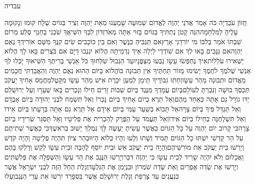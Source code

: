 \documentclass[../main/main.tex]{subfiles}
\begin{document}
\Incipit{}עבדיה\par
\vspace{\afterchapskip}
\RTLmulticolcolumns
\begin{multicols}{\ncols}
חֲזוֹן עֹבַדְיָה כֹּה אָמַר אֲדֹנַי יַהְוֶה לֶאֱדוֹם שְׁמוּעָה שָׁמַעְנוּ מֵאֵת יַהְוֶה וְצִיר בַּגּוֹיִם שֻׁלָּח קוּמוּ וְנָקוּמָה עָלֶיהָ לַמִּלְחָמָה\PreVerseSpace{}הִנֵּה קָטֹן נְתַתִּיךָ בַּגּוֹיִם בָּזוּי אַתָּה מְאֹד\PreVerseSpace{}זְדוֹן לִבְּךָ הִשִּׁיאֶךָ שֹׁכְנִי בְחַגְוֵי סֶלַע מְרוֹם שִׁבְתּוֹ אֹמֵר בְּלִבּוֹ מִי יוֹרִדֵנִי אָרֶץ\PreVerseSpace{}אִם תַּגְבִּיהַּ כַּנֶּשֶׁר וְאִם בֵּין כּוֹכָבִים שִׂים קִנֶּךָ מִשָּׁם אוֹרִידְךָ נְאֻם יַהְוֶה\PreVerseSpace{}אִם גַּנָּבִים בָּאוּ לְךָ אִם שׁוֹדְדֵי לַיְלָה אֵיךְ נִדְמֵיתָה הֲלוֹא יִגְנְבוּ דַּיָּם אִם בֹּצְרִים בָּאוּ לָךְ הֲלוֹא יַשְׁאִירוּ עֹלֵלוֹת\PreVerseSpace{}אֵיךְ נֶחְפְּשׂוּ עֵשָׂו נִבְעוּ מַצְפֻּנָיו\PreVerseSpace{}עַד הַגְּבוּל שִׁלְּחוּךָ כֹּל אַנְשֵׁי בְרִיתֶךָ הִשִּׁיאוּךָ יָכְלוּ לְךָ אַנְשֵׁי שְׁלֹמֶךָ לֹחֲמֶךָ\SubEnd{} יָשִׂימוּ מָזוֹר תַּחְתֶּיךָ אֵין תְּבוּנָה בּוֹ\PreVerseSpace{}הֲלוֹא בַּיּוֹם הַהוּא נְאֻם יַהְוֶה וְהַאֲבַדְתִּי חֲכָמִים מֵאֱדוֹם וּתְבוּנָה מֵהַר עֵשָׂו\PreVerseSpace{}וְחַתּוּ גִבּוֹרֶיךָ תֵּימָן לְמַעַן יִכָּרֶת אִישׁ מֵהַר עֵשָׂו מִקָּטֶל\PreVerseSpace{}מֵחֲמַס אָחִיךָ יַעֲקֹב תְּכַסְּךָ בוּשָׁה וְנִכְרַתָּ לְעוֹלָם\PreVerseSpace{}בְּיוֹם עֲמָדְךָ מִנֶּגֶד בְּיוֹם שְׁבוֹת זָרִים חֵילוֹ וְנָכְרִים בָּאוּ שְׁעָרָו וְעַל יְרוּשָׁלֵם יַדּוּ גוֹרָל גַּם אַתָּה כְּאַחַד מֵהֶם\PreVerseSpace{}וְאַל תֵּרֶא בְיוֹם אָחִיךָ בְּיוֹם נָכְרוֹ וְאַל תִּשְׂמַח לִבְנֵי יְהוּדָה בְּיוֹם אָבְדָם וְאַל תַּגְדֵּל פִּיךָ בְּיוֹם צָרָה\PreVerseSpace{}אַל תָּבוֹא בְשַׁעַר עַמִּי בְּיוֹם אֵידָם אַל תֵּרֶא גַם אַתָּה בְּרָעָתוֹ בְּיוֹם אֵידוֹ וְאַל תִּשְׁלָחֶנָּה\SubEnd{} בְחֵילוֹ בְּיוֹם אֵידוֹ\PreVerseSpace{}וְאַל תַּעֲמֹד עַל הַפֶּרֶק לְהַכְרִית אֶת פְּלִיטָיו וְאַל תַּסְגֵּר שְׂרִידָיו בְּיוֹם צָרָה\PreVerseSpace{}כִּי קָרוֹב יוֹם יַהְוֶה עַל כָּל הַגּוֹיִם כַּאֲשֶׁר עָשִׂיתָ יֵעָשֶׂה לָּךְ גְּמֻלְךָ יָשׁוּב בְּרֹאשֶׁךָ\PreVerseSpace{}כִּי כַּאֲשֶׁר שְׁתִיתֶם עַל הַר קָדְשִׁי יִשְׁתּוּ כָל הַגּוֹיִם תָּמִיד וְשָׁתוּ וְלָעוּ וְהָיוּ כְּלוֹא הָיוּ\PreVerseSpace{}וּבְהַר צִיּוֹן תִּהְיֶה פְלֵיטָה וְהָיָה קֹדֶשׁ וְיָרְשׁוּ בֵּית יַעֲקֹב אֵת מוֹרִשֵׁיהֶם\SubEnd{}\PreVerseSpace{}וְהָיָה בֵית יַעֲקֹב אֵשׁ וּבֵית יוֹסֵף לֶהָבָה וּבֵית עֵשָׂו לְקַשׁ וְדָלְקוּ בָהֶם וַאֲכָלוּם וְלֹא יִהְיֶה שָׂרִיד לְבֵית עֵשָׂו כִּי יַהְוֶה דִּבֵּר\PreVerseSpace{}וְיָרְשׁוּ הַנֶּגֶב אֶת הַר עֵשָׂו וְהַשְּׁפֵלָה אֶת פְּלִשְׁתִּים וְיָרְשׁוּ אֶת שְׂדֵה אֶפְרַיִם וְאֵת שְׂדֵה שֹׁמְרוֹן וּבִנְיָמִן אֶת הַגִּלְעָד\PreVerseSpace{}וְגָלֻת הַחֵל הַזֶּה לִבְנֵי יִשְׂרָאֵל אֲשֶׁר כְּנַעֲנִים עַד צָרְפַת וְגָלֻת יְרוּשָׁלֵם אֲשֶׁר בִּסְפָרַד יִרְשׁוּ אֵת עָרֵי הַנֶּגֶב\PreVerseSpace{}וְעָלוּ 
\end{multicols}
\end{document}
